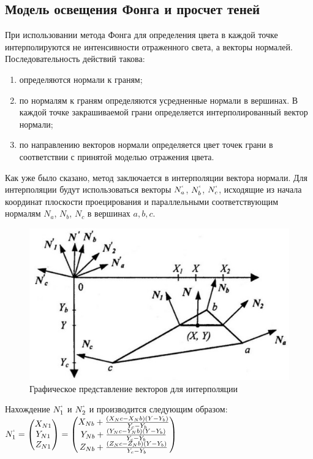 \documentclass[a4paper, 10pt]{article}
\begin{document}
	\subsection{Модель освещения Фонга и просчет теней}
	\hspace*{5mm}При использовании метода Фонга для определения цвета в каждой точке интерполируются не интенсивности отраженного света, а векторы нормалей\cite{fong}.
	Последовательность действий такова:
	\begin{enumerate}
		\item определяются нормали к граням;
		\item по нормалям к граням определяются усредненные нормали в вершинах. В каждой точке закрашиваемой грани определяется интерполированный вектор нормали;
		\item по направлению векторов нормали определяется цвет точек грани в соответствии с принятой моделью отражения цвета.
	\end{enumerate}
	 \hspace*{5mm} Как уже было сказано, метод заключается в интерполяции вектора нормали. Для интерполяции будут использоваться векторы  $N_a^{`}$, $N_b^{`}$, $N_c^{`}$, исходящие из начала координат плоскости проецирования и параллельными соответствующим нормалям $N_a$, $N_b$, $N_c$ в вершинах $a, b, c$.
	 \clearpage
	 \newpage
	 \begin{figure}[h!]
	 	\centering
	 	\includegraphics[scale=0.9]{lines}
	 	\centering\caption{Графическое представление векторов для интерполяции}
	 \end{figure}
 	Нахождение $N_1^{`}$ и $N_2^{`}$ и производится следующим образом:
 	\newline \newline  \hspace*{3cm} $N_1^`=\begin{pmatrix} X_{N1}\\Y_{N1}\\Z_{N1}\end{pmatrix} = 
 	\begin{pmatrix} X_{Nb} + \frac{(X_Nc - X_Nb)(Y - Y_b)}{Y_c -Y_b}\\
 		Y_{Nb} + \frac{(Y_Nc - Y_Nb)(Y - Y_b)}{Y_c -Y_b}\\
 		Z_{Nb} + \frac{(Z_Nc - Z_Nb)(Y - Y_b)}{Y_c -Y_b}\end{pmatrix}$
\end{document}
